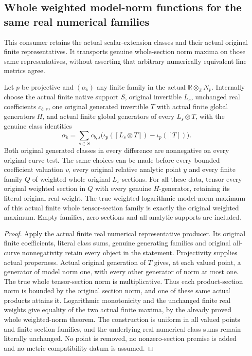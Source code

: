 \subsection{Whole weighted model-norm functions for the same real numerical families}
This consumer retains the actual scalar-extension classes and their actual
original finite representatives. It transports genuine whole-section norm
maxima on those same representatives, without asserting that arbitrary
numerically equivalent line metrics agree.

\begin{theorem}
\label{thm:seven-native-real-numerical-weighted-promotion}
\leanok
{}
Let $p$ be projective and $(\alpha_b)$ any finite family in the actual
$\mathbb R\otimes_{\mathbb Z}N_p$. Internally choose the actual finite
native support $S$, original invertible $L_s$, unchanged real coefficients
$c_{b,s}$, one original generated invertible $T$ with actual finite global
generators $H$, and actual finite global generators of every $L_s\otimes T$,
with the genuine class identities
\[
 \alpha_b=\sum_{s\in S}c_{b,s}
   \bigl(\iota_p([L_s\otimes T])-\iota_p([T])\bigr).
\]
Both original generated classes in every difference are nonnegative on
every original curve test. The same choices can be made before every
bounded coefficient valuation $v$, every original relative analytic point
$y$ and every finite family $Q$ of weighted whole original $L_s$-sections.
For all these data, tensor every original weighted section in $Q$ with
every genuine $H$-generator, retaining its literal original real weight.
The true weighted logarithmic model-norm maximum of this actual finite
whole tensor-section family is exactly the original weighted maximum.
Empty families, zero sections and all analytic supports are included.
\end{theorem}
\begin{proof}
Apply the actual finite real numerical representative producer. Its
original finite coefficients, literal class sums, genuine generating
families and original all-curve nonnegativity retain every object in
the statement. Projectivity supplies actual properness. Actual original
generation of $T$ gives, at each valued point, a generator of model norm
one, with every other generator of norm at most one. The true whole
tensor-section norm is multiplicative. Thus each product-section norm
is bounded by the original section norm, and one of these same actual
products attains it. Logarithmic monotonicity and the unchanged finite
real weights give equality of the two actual finite maxima, by the
already proved whole weighted-norm theorem. The construction is uniform
in all valued points and finite section families, and the underlying
real numerical class sums remain literally unchanged. No point is
removed, no nonzero-section premise is added and no metric compatibility
datum is assumed.
\end{proof}
